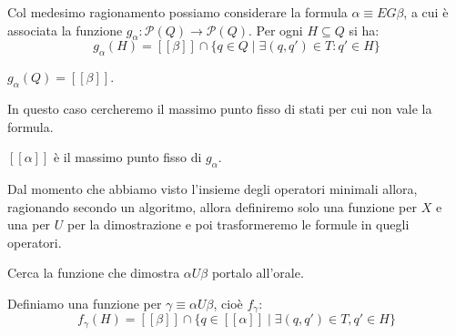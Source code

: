 Col medesimo ragionamento possiamo considerare la formula  $\alpha \equiv E G
    \beta$, a cui è associata la funzione $g_\alpha: \mathcal{P}(Q) \to \mathcal{P}(Q)$.
Per ogni $H \subseteq Q$ si ha:
\begin{equation}
    g_\alpha(H) = [[\beta]] \cap \{q \in Q \mid \exists(q, q') \in T: q ' \in H\}
\end{equation}
\begin{osservazione}
    $g_\alpha (Q) = [[\beta]]$.
\end{osservazione}
In questo caso cercheremo il massimo punto fisso di stati per cui non vale la
formula.
\begin{center}
    $[[\alpha]]$ è il massimo punto fisso di $g_\alpha$.
\end{center}
Dal momento che abbiamo visto l'insieme degli operatori minimali allora,
ragionando secondo un algoritmo, allora definiremo solo una funzione per $X$ e
una per $U$ per la dimostrazione e poi trasformeremo le formule in quegli operatori.
\begin{nota}
    Cerca la funzione che dimostra $\alpha U \beta$ portalo all'orale.
\end{nota}
Definiamo una funzione per $\gamma \equiv \alpha U \beta$, cioè $f_\gamma$:
\begin{equation}
    f_\gamma(H) = [[\beta]] \cap \{q\in [[\alpha]] \mid \exists (q, q')\in T, q'\in H\}
\end{equation}
